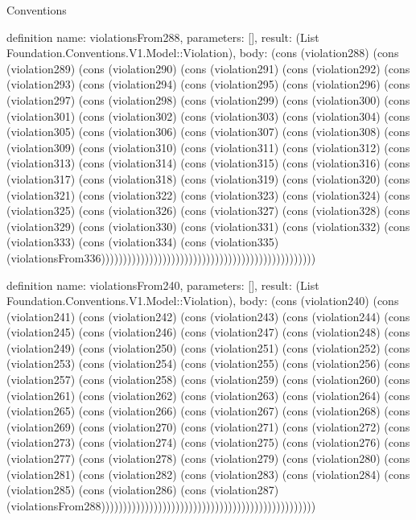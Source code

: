 \begin{lexlean}{Conventions}
\begin{semanticmodule}
definition{
  name: violationsFrom288,
  parameters: [],
  result: (List Foundation.Conventions.V1.Model::Violation),
  body: (cons (violation288) (cons (violation289) (cons (violation290) (cons (violation291) (cons (violation292) (cons (violation293) (cons (violation294) (cons (violation295) (cons (violation296) (cons (violation297) (cons (violation298) (cons (violation299) (cons (violation300) (cons (violation301) (cons (violation302) (cons (violation303) (cons (violation304) (cons (violation305) (cons (violation306) (cons (violation307) (cons (violation308) (cons (violation309) (cons (violation310) (cons (violation311) (cons (violation312) (cons (violation313) (cons (violation314) (cons (violation315) (cons (violation316) (cons (violation317) (cons (violation318) (cons (violation319) (cons (violation320) (cons (violation321) (cons (violation322) (cons (violation323) (cons (violation324) (cons (violation325) (cons (violation326) (cons (violation327) (cons (violation328) (cons (violation329) (cons (violation330) (cons (violation331) (cons (violation332) (cons (violation333) (cons (violation334) (cons (violation335) (violationsFrom336)))))))))))))))))))))))))))))))))))))))))))))))))
}

definition{
  name: violationsFrom240,
  parameters: [],
  result: (List Foundation.Conventions.V1.Model::Violation),
  body: (cons (violation240) (cons (violation241) (cons (violation242) (cons (violation243) (cons (violation244) (cons (violation245) (cons (violation246) (cons (violation247) (cons (violation248) (cons (violation249) (cons (violation250) (cons (violation251) (cons (violation252) (cons (violation253) (cons (violation254) (cons (violation255) (cons (violation256) (cons (violation257) (cons (violation258) (cons (violation259) (cons (violation260) (cons (violation261) (cons (violation262) (cons (violation263) (cons (violation264) (cons (violation265) (cons (violation266) (cons (violation267) (cons (violation268) (cons (violation269) (cons (violation270) (cons (violation271) (cons (violation272) (cons (violation273) (cons (violation274) (cons (violation275) (cons (violation276) (cons (violation277) (cons (violation278) (cons (violation279) (cons (violation280) (cons (violation281) (cons (violation282) (cons (violation283) (cons (violation284) (cons (violation285) (cons (violation286) (cons (violation287) (violationsFrom288)))))))))))))))))))))))))))))))))))))))))))))))))
}


\end{semanticmodule}
\end{lexlean}
